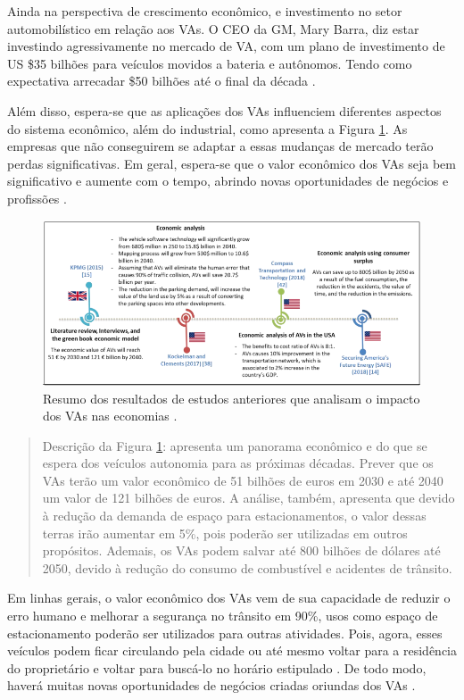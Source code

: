 Ainda na perspectiva de crescimento econômico, e investimento no setor automobilístico em relação aos VAs. O CEO da GM, Mary Barra, diz estar investindo agressivamente no mercado de VA, com um plano de investimento de US \$35 bilhões para veículos movidos a bateria e autônomos. Tendo como expectativa arrecadar \$50 bilhões até o final da década \cite{gm}.

Além disso, espera-se que as aplicações dos VAs influenciem diferentes aspectos do sistema econômico, além do industrial, como apresenta a Figura \ref{figura_resumo}. As empresas que não conseguirem se adaptar a essas mudanças 
 de mercado terão perdas significativas. Em geral, espera-se que o valor econômico dos VAs seja bem significativo e aumente com o tempo, abrindo novas oportunidades de negócios e profissões \cite{mundobrasil}.

\begin{figure}[H]
\centering
\includegraphics[width=\textwidth]{Figures/vas-mercado.png}
\caption{Resumo dos resultados de estudos anteriores que analisam o impacto dos VAs nas economias \cite{mundobrasil}.}
\label{figura_resumo}
\end{figure}

\begin{quote}
Descrição da Figura \ref{figura_resumo}: apresenta um panorama econômico e do que se espera dos veículos autonomia para as próximas décadas. Prever que os VAs terão um valor econômico de 51 bilhões de euros em 2030 e até 2040 um valor de 121 bilhões de euros. A análise, também, apresenta que devido à redução da demanda de espaço para estacionamentos, o valor dessas terras irão aumentar em 5\%, pois poderão ser utilizadas em outros propósitos. Ademais, os VAs podem salvar até 800 bilhões de dólares até 2050, devido à redução do consumo de combustível e acidentes de trânsito. 
\end{quote}

Em linhas gerais, o valor econômico dos VAs vem de sua capacidade de reduzir o erro humano e melhorar a segurança no trânsito em 90\%, usos como espaço de estacionamento poderão ser utilizados para outras atividades. Pois, agora, esses veículos podem ficar circulando pela cidade ou até mesmo voltar para a residência do proprietário e voltar para buscá-lo no horário estipulado \cite{4cenarios_ocidental}. De todo modo, haverá muitas novas oportunidades de negócios criadas oriundas dos VAs \cite{mundobrasil}.




